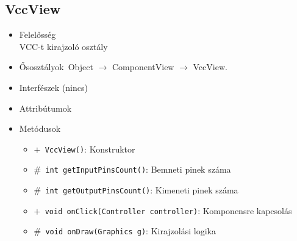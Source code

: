 \subsection{VccView}
\begin{itemize}
\item Felelősség\\
VCC-t kirajzoló osztály
\item Ősosztályok\ Object $\rightarrow{}$ ComponentView $\rightarrow{}$ VccView.
\item Interfészek (nincs)
\item Attribútumok $\ $
\item Metódusok$\ $
\begin{itemize}
	\item[] \texttt{$+$ VccView()}: Konstruktor
	\item[] \texttt{$\#$ int getInputPinsCount()}: Bemneti pinek száma
	\item[] \texttt{$\#$ int getOutputPinsCount()}: Kimeneti pinek száma
	\item[] \texttt{$+$ void onClick(Controller controller)}: Komponensre kapcsolás
	\item[] \texttt{$\#$ void onDraw(Graphics g)}: Kirajzolási logika
\end{itemize}
\end{itemize}

